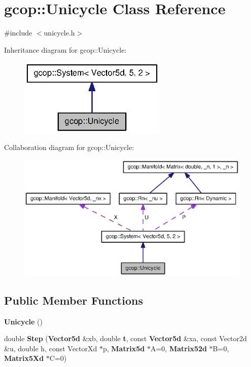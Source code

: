 \section{gcop\-:\-:\-Unicycle \-Class \-Reference}
\label{classgcop_1_1Unicycle}


{\ttfamily \#include $<$unicycle.\-h$>$}



\-Inheritance diagram for gcop\-:\-:\-Unicycle\-:
\nopagebreak
\begin{figure}[H]
\begin{center}
\leavevmode
\includegraphics[width=200pt]{classgcop_1_1Unicycle__inherit__graph}
\end{center}
\end{figure}


\-Collaboration diagram for gcop\-:\-:\-Unicycle\-:
\nopagebreak
\begin{figure}[H]
\begin{center}
\leavevmode
\includegraphics[width=350pt]{classgcop_1_1Unicycle__coll__graph}
\end{center}
\end{figure}
\subsection*{\-Public \-Member \-Functions}
\begin{DoxyCompactItemize}
\item 
{\bf \-Unicycle} ()
\item 
double {\bf \-Step} ({\bf \-Vector5d} \&xb, double {\bf t}, const {\bf \-Vector5d} \&xa, const \-Vector2d \&u, double h, const \-Vector\-Xd $\ast$p, {\bf \-Matrix5d} $\ast$\-A=0, {\bf \-Matrix52d} $\ast$\-B=0, {\bf \-Matrix5\-Xd} $\ast$\-C=0)
\end{DoxyCompactItemize}
